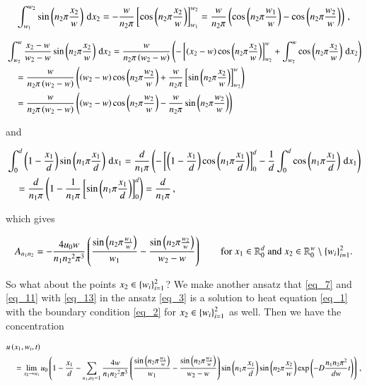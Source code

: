 \documentclass[11pt,english,a4paper]{article}
\begin{document}
\begin{flushleft}
\begin{align*}
\int_{w_1}^{w_2}\sin\left({n_2\pi\frac{x_2}{w}}\right)\,\mathrm{d}x_2 = -\frac{w}{n_2 \pi}\left[{\cos\left({n_2\pi\frac{x_2}{w}}\right)}\right]_{w_1}^{w_2} = \frac{w}{n_2 \pi}\left({\cos\left({n_2\pi\frac{w_1}{w}}\right) - \cos\left({n_2\pi\frac{w_2}{w}}\right)}\right)\,,
\end{align*}

\begin{align*}
&\int_{w_2}^{w}\frac{x_2-w}{w_2-w}\sin\left({n_2\pi\frac{x_2}{w}}\right)\,\mathrm{d}x_2 = \frac{w}{n_2 \pi\left({w_2-w}\right)}\left({-\left[{\left({x_2-w}\right)\cos\left({n_2\pi\frac{x_2}{w}}\right)}\right]_{w_2}^w + \int_{w_2}^w \cos\left({n_2\pi\frac{x_2}{w}}\right)\,\mathrm{d}x_2}\right)
\\
&\quad = \frac{w}{n_2 \pi\left({w_2-w}\right)}\left({\left({w_2-w}\right)\cos\left({n_2\pi\frac{w_2}{w}}\right) + \frac{w}{n_2 \pi}\left[{ \sin\left({n_2\pi\frac{x_2}{w}}\right)}\right]_{w_2}^w}\right)
\\
&\quad = \frac{w}{n_2 \pi\left({w_2-w}\right)}\left({\left({w_2-w}\right)\cos\left({n_2\pi\frac{w_2}{w}}\right) - \frac{w}{n_2 \pi} \sin\left({n_2\pi\frac{w_2}{w}}\right)}\right)
\end{align*}

and

\begin{align*}
&\int_{0}^{d}\left({1-\frac{x_1}{d}}\right)\sin\left({n_1\pi\frac{x_1}{d}}\right)\,\mathrm{d}x_1 = \frac{d}{n_1\pi}\left({-\left[{\left({1-\frac{x_1}{d}}\right)\cos\left({n_1\pi\frac{x_1}{d}}\right)}\right]_0^d - \frac{1}{d}\int_{0}^{d}\cos\left({n_1\pi\frac{x_1}{d}}\right)\,\mathrm{d}x_1}\right)
\\
&\quad = \frac{d}{n_1\pi}\left({1 - \frac{1}{n_1 \pi}\left[{\sin\left({n_1\pi\frac{x_1}{d}}\right)}\right]_0^d}\right) = \frac{d}{n_1 \pi}\,,
\end{align*}

which gives

\begin{align}
A_{n_1 n_2} = -\frac{4 u_0 w}{n_1 {n_2}^2 \pi^3}\left({\frac{\sin\left({n_2 \pi \frac{w_1}{w}}\right)}{w_1}-\frac{\sin\left({n_2 \pi \frac{w_2}{w}}\right)}{w_2-w}}\right) \qquad \text{for $x_1\in\mathbb{R}_0^d$ and $x_2\in\mathbb{R}_0^w \setminus \left\lbrace{w_i}\right\rbrace_{i=1}^2$.}
\label{eq_13}
\end{align}

So what about the points $x_2\in\left\lbrace{w_i}\right\rbrace_{i=1}^2$? We make another ansatz that \eqref{eq_7} and \eqref{eq_11} with \eqref{eq_13} in the ansatz \eqref{eq_3} is a solution to heat equation \eqref{eq_1} with the boundary condition \eqref{eq_2} for $x_2\in\left\lbrace{w_i}\right\rbrace_{i=1}^2$ as well. Then we have the concentration

\begin{align}
&u\left({x_1,w_i,t}\right) 
\label{eq_14}\\
&\quad = \lim_{x_2\to w_i}u_0\left({1-\frac{x_1}{d} - \sum_{n_1,n_2=1} \frac{4 w}{n_1 {n_2}^2 \pi^3}\left({\frac{\sin\left({n_2 \pi \frac{w_1}{w}}\right)}{w_1}-\frac{\sin\left({n_2 \pi \frac{w_2}{w}}\right)}{w_2-w}}\right)\sin\left({n_1\pi \frac{x_1}{d}}\right) \sin\left({n_2\pi \frac{x_2}{w}}\right) \exp\left({-D\frac{n_1 n_2 \pi^2}{dw} t}\right)}\right)\,,
\nonumber
\end{align}


\end{flushleft}
\end{document}
